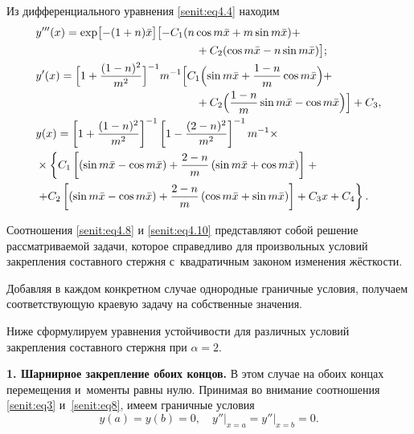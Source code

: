 Из дифференциального уравнения \eqref{senit:eq4.4} %
находим 
\begin{equation}
\label{senit:eq4.10}
\begin{aligned}
& y'''(x)=\exp \bigl[-(1+n)\bar{x} \bigr]
\bigl[-C_1 (n\cos m\bar{x} +m \sin m\bar{x} )+\\
&\hspace{5cm} +C_2 (\cos m\bar{x} -n \sin m\bar{x} )\bigr];\\
& y'(x)=\Bigl[1+\frac{(1-n)^2}{m^2}\Bigr]^{-1}m^{-1}
\Bigl[C_1 \Bigl(\sin m\bar{x} +\frac{1-n}{m}\cos m\bar{x} \Bigr)+\\
& \hspace{5cm} +C_2 \Bigl(\frac{1-n}{m}\sin m\bar{x} -\cos m\bar{x} \Bigr) \Bigr]+C_3, \\
& y(x)=\left[1+\frac{(1-n)^2}{m^2}\right]^{-1}\left[1-\frac{(2-n)^2}{m^2}\right]^{-1}m^{-1}\times\\
&\times \left\{ C_1
\left[\left(\sin m\bar{x} -\cos m\bar{x} \right )+\frac{2-n}{m}\left(\sin m\bar{x}
+\cos m\bar{x}\right) \right] \right.+ \\
&\left. +C_2\left [\left(\sin m\bar{x} -\cos m\bar{x} \right)+\frac{2-n}{m}\left(\cos m\bar{x} +\sin m\bar{x} \right)\right]+C_3 x+C_4 \right \}.
\end{aligned}
\end{equation}


Соотношения \eqref{senit:eq4.8} и \eqref{senit:eq4.10}  представляют собой решение рассматриваемой задачи, которое
справедливо для произвольных условий закрепления составного стержня с~квадратичным законом изменения жёсткости.

Добавляя в каждом конкретном случае однородные граничные условия, получаем
соответствующую краевую задачу на собственные значения.

Ниже сформулируем уравнения устойчивости для различных условий закрепления составного стержня при $\alpha =2$.

\smallskip

\textbf{1. Шарнирное закрепление обоих концов.}
В этом случае на обоих концах перемещения и~моменты равны нулю. Принимая во внимание соотношения \eqref{senit:eq3} и~\eqref{senit:eq8}, имеем граничные
условия
\begin{equation}
\label{senit:eq4.11}
y(a)=y(b)=0,\quad  y'' \big|_{x=a} =y''\big|_{x=b}=0.
\end{equation}

